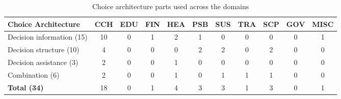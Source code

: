 \begin{table}[htbp]
\centering
\small
\begin{tabular}{|p{}|cccccccccc|}
\hline
\textbf{Choice Architecture} & \textbf{CCH} & \textbf{EDU} & \textbf{FIN} & \textbf{HEA} & \textbf{PSB} & \textbf{SUS} & \textbf{TRA} & \textbf{SCP} & \textbf{GOV} & \textbf{MISC} \\ \hline
Decision information (15) & 10 & 0 & 1 & 2 & 1 & 0 & 0 & 0 & 0 & 1 \\
Decision structure (10) & 4 & 0 & 0 & 0 & 2 & 2 & 0 & 2 & 0 & 0 \\
Decision assistance (3) & 2 & 0 & 0 & 1 & 0 & 0 & 0 & 0 & 0 & 0 \\
Combination (6) & 2 & 0 & 0 & 1 & 0 & 1 & 1 & 1 & 0 & 0 \\ \hline
\textbf{Total (34)} & 18 & 0 & 1 & 4 & 3 & 3 & 1 & 3 & 0 & 1 \\ \hline
\end{tabular}
\caption{Choice architecture parts used across the domains}
\label{tabel:choice-arch-domains}
\end{table}

